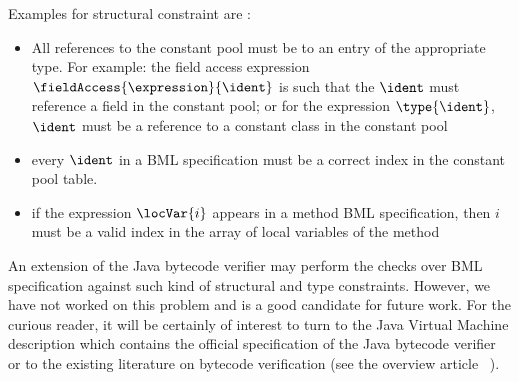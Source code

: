 Examples for structural constraint are :
\begin{itemize}
    \item All references to the constant pool must be to an entry of the appropriate type. For example:
          the field access expression  $\fieldAccess{\expression}{\ident}$ is such that the
	  $\ident$ must reference a field in the constant pool; or for the expression $\type{\ident}$, $\ident$
	  must be a reference to a constant class in the constant pool
    
    \item every $\ident$ in a BML specification must be a correct index in the constant pool table. 
    
    \item if the  expression $\locVar{i}$ appears in a method BML specification, then
          $i$ must be a valid index in the array of local variables of the method
\end{itemize}

An extension of the Java bytecode verifier may perform the checks
 over BML specification against such kind of structural and type constraints.
However, we have not worked on this problem and is a good candidate for future work.
For the curious reader, it will be certainly of interest to turn to the Java Virtual Machine 
description \cite{VMSpec} which contains the official
 specification of the Java bytecode verifier    
or to the existing literature on bytecode verification (see the overview article ~\cite{Ljbc}).
 







